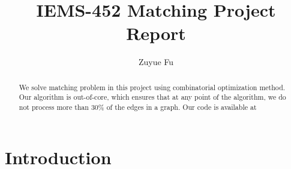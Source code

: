 \documentclass{article}
\title{IEMS-452 Matching Project Report}
\author{Zuyue Fu}
\begin{document}
\maketitle

\begin{abstract}
We solve matching problem in this project using combinatorial optimization method.   Our algorithm is  out-of-core, which ensures that  at any point of  the algorithm,  we do not process  more than 30\% of the edges in a graph.   Our code  is available  at 
\end{abstract}


\section{Introduction}
\end{document}
